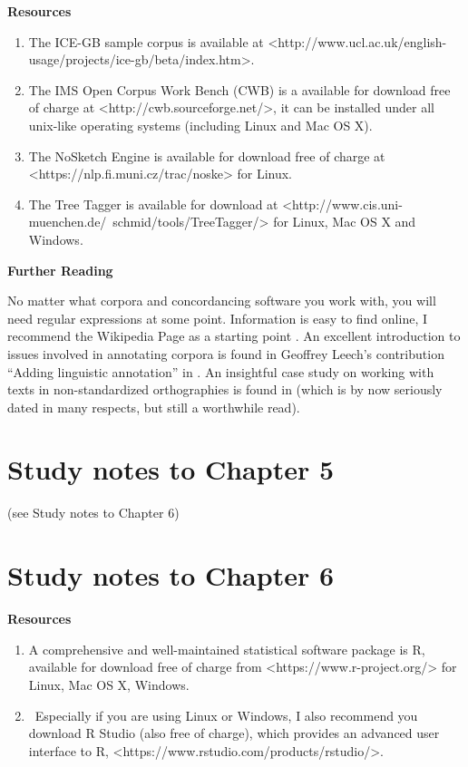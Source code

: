 \textbf{Resources}

\begin{enumerate}
  \item The ICE-GB sample corpus is available at <http://www.ucl.ac.uk/english-usage/projects/ice-gb/beta/index.htm>.
  \item The IMS Open Corpus Work Bench (CWB) is a available for download free of charge at <http://cwb.sourceforge.net/>, it can be installed under all unix-like operating systems (including Linux and Mac OS X).
  \item The NoSketch Engine is available for download free of charge at <https://nlp.fi.muni.cz/trac/noske> for Linux.
  \item The Tree Tagger is available for download at <http://www.cis.uni-muenchen.de/~schmid/tools/TreeTagger/> for Linux, Mac OS X and Windows.
\end{enumerate}


\textbf{Further Reading}

No matter what corpora and concordancing software you work with, you will need regular expressions at some point. Information is easy to find online, I recommend the Wikipedia Page as a starting point \citep{wikipedia_contributors_regular_2018}. An excellent introduction to issues involved in annotating corpora is found in Geoffrey Leech's contribution ``Adding linguistic annotation'' in \citet{wynne_developing_2005}. An insightful case study on working with texts in non-standardized orthographies is found in \citet{barnbrook_language_1996} (which is by now seriously dated in many respects, but still a worthwhile read).


\section{Study notes to Chapter 5}
\label{sec:studynotes05}

(see Study notes to Chapter 6)


\section{Study notes to Chapter 6}
\label{sec:studynotes06}

\textbf{Resources}

\begin{enumerate}
  \item A comprehensive and well-maintained statistical software package is R, available for download free of charge from <https://www.r-project.org/> for Linux, Mac OS X, Windows.
  \item Especially if you are using Linux or Windows, I also recommend you download R Studio (also free of charge), which provides an advanced user interface to R, <https://www.rstudio.com/products/rstudio/>.
\end{enumerate}


